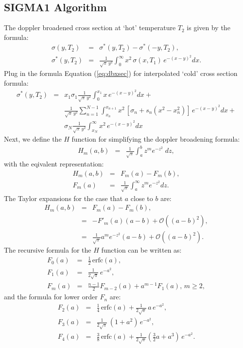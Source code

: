 \subsection{SIGMA1 Algorithm}
The doppler broadened cross section at `hot' temperature $T_2$ is given by the formula:
\begin{eqnarray}
\sigma(y,T_2) &=& \sigma^{*}(y,T_2) - \sigma^{*}(-y,T_2),\\[1ex]
\sigma^{*}(y,T_2) &=& \frac{1}{\sqrt{\pi}\,y^2}\int_{0}^{\infty}x^2\,\sigma(x,T_1)\,e^{-(x-y)^2}dx.
\end{eqnarray}
Plug in the formula Equation (\ref{eq:dbxsec}) for interpolated `cold' cross section formula:
\begin{eqnarray}
\sigma^{*}(y,T_2) &=& x_1\sigma_1\frac{1}{\sqrt{\pi}\,y^2}\int_{0}^{x_1}x\,e^{-(x-y)^2}dx+\nonumber\\
&&\frac{1}{\sqrt{\pi}\,y^2}\sum_{n=1}^{N-1}\int_{x_{n}}^{x_{n+1}}x^2\,[\sigma_n+s_n(x^2-x_n^2)]\,e^{-(x-y)^2}dx+\nonumber\\
&&\sigma_N\frac{1}{\sqrt{\pi}\,y^2}\int_{x_N}^{\infty}x^2\,e^{-(x-y)^2}dx
\end{eqnarray}
Next, we define the $H$ function for simplifying the doppler broadening formula:
\begin{eqnarray}
H_m(a,b) &=& \frac{1}{\sqrt{\pi}}\int_{a}^{b}z^me^{-z^2}\;dz,
\end{eqnarray}
with the eqivalent representation:
\begin{eqnarray}
H_m(a,b) &=& F_m(a)-F_m(b),\\[1ex]
F_m(a) &=& \frac{1}{\sqrt{\pi}}\int_{a}^{\infty}z^me^{-z^2}dz.
\end{eqnarray}
The Taylor expansions for the case that $a$ close to $b$ are:
\begin{eqnarray}
H_m(a,b) &=& F_m(a)-F_m(b),\\[1ex]
&=& -F'_m(a)(a-b)+\mathcal{O}((a-b)^2),\\[1ex]
&=& \frac{1}{\sqrt{\pi}}a^me^{-z^2}(a-b)+\mathcal{O}((a-b)^2).
\end{eqnarray}
The recursive formula for the $H$ function can be written as:
\begin{eqnarray}
F_0(a) &=& \frac{1}{2}\,\mbox{erfc}(a),\\
F_1(a) &=& \frac{1}{2\sqrt{\pi}}\,e^{-a^2},\\
F_m(a) &=& \frac{n-1}{2}F_{m-2}(a)+a^{m-1}F_1(a),\,m\geq 2,
\end{eqnarray}
and the formula for lower order $F_n$ are:
\begin{eqnarray}
F_2(a) &=& \frac{1}{4}\,\mbox{erfc}(a)+\frac{1}{2\sqrt{\pi}}\,a\,e^{-a^2},\\
F_3(a) &=& \frac{1}{2\sqrt{\pi}}\,\left(1+a^2\right)\,e^{-a^2},\\
F_4(a) &=& \frac{3}{8}\,\mbox{erfc}(a)+\frac{1}{2\sqrt{\pi}}\left(\frac{3}{2}a+a^3\right)\,e^{-a^2}.
\end{eqnarray}
